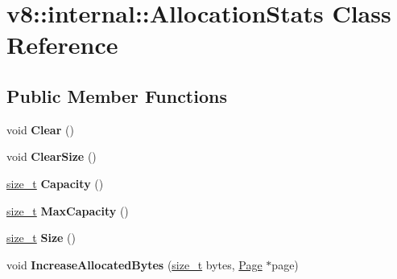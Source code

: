 \hypertarget{classv8_1_1internal_1_1AllocationStats}{}\section{v8\+:\+:internal\+:\+:Allocation\+Stats Class Reference}
\label{classv8_1_1internal_1_1AllocationStats}
\subsection*{Public Member Functions}
\begin{DoxyCompactItemize}
\item 
\mbox{\label{classv8_1_1internal_1_1AllocationStats_a6e162cd13b5f72049d7debad2203f191}} 
void {\bfseries Clear} ()
\item 
\mbox{\label{classv8_1_1internal_1_1AllocationStats_a587f5be1a4ea26b70d6d555b4d43ec15}} 
void {\bfseries Clear\+Size} ()
\item 
\mbox{\label{classv8_1_1internal_1_1AllocationStats_ab6fa0ff1b82bccabec0c16eba7bed184}} 
\mbox{\hyperlink{classsize__t}{size\+\_\+t}} {\bfseries Capacity} ()
\item 
\mbox{\label{classv8_1_1internal_1_1AllocationStats_a6b099a9940e39e27094d43b34f5c972a}} 
\mbox{\hyperlink{classsize__t}{size\+\_\+t}} {\bfseries Max\+Capacity} ()
\item 
\mbox{\label{classv8_1_1internal_1_1AllocationStats_ad6f91ce6cedea567a8441f2c9afc3058}} 
\mbox{\hyperlink{classsize__t}{size\+\_\+t}} {\bfseries Size} ()
\item 
\mbox{\label{classv8_1_1internal_1_1AllocationStats_afc0fb2100ed8bffa17f030c7d08e8f00}} 
void {\bfseries Increase\+Allocated\+Bytes} (\mbox{\hyperlink{classsize__t}{size\+\_\+t}} bytes, \mbox{\hyperlink{classv8_1_1internal_1_1Page}{Page}} $\ast$page)
\item 
\mbox{\label{classv8_1_1internal_1_1AllocationStats_a347d8287921f240bc799082cfb8048d9}} 

\end{DoxyCompactItemize}

